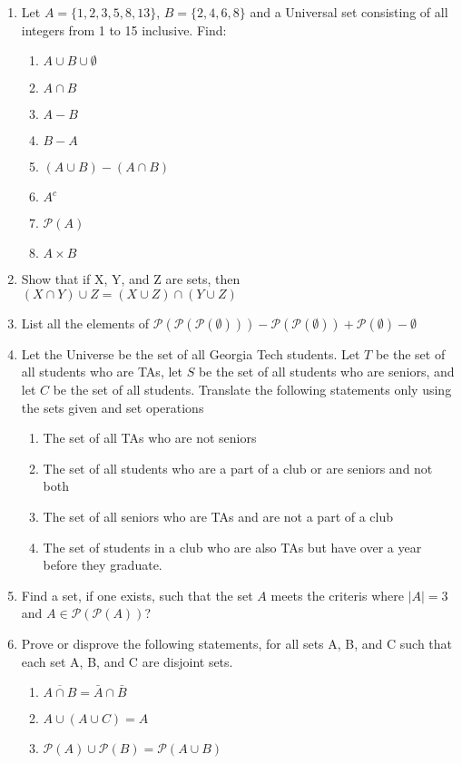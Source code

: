 \documentclass{article}
\begin{document}
\begin{enumerate}
    \item Let $A = \{1, 2, 3, 5, 8, 13\}$,  $B = \{2, 4, 6, 8\}$ and a Universal set consisting of all integers from 1 to 15 inclusive. Find:
        \begin{enumerate}
            \item $A \cup B \cup \emptyset$
            \item $A \cap B$
            \item $A - B$
            \item $B - A$
            \item $(A \cup B) - (A \cap B)$
            \item $A^c$
            \item $\mathcal{P}(A)$
            \item $A \times B$
        \end{enumerate}
    
    \item Show that if X, Y, and Z are sets, then $(X \cap Y) \cup Z = (X \cup Z) \cap (Y \cup Z)$
    
    \item List all the elements of $\mathcal{P}(\mathcal{P}(\mathcal{P}(\emptyset))) - \mathcal{P}(\mathcal{P}(\emptyset)) + \mathcal{P}(\emptyset) - \emptyset$
    \item Let the Universe be the set of all Georgia Tech students. Let $T$ be the set of all students who are TAs, let $S$ be the set of all students who are seniors, and let $C$ be the set of all students. Translate the following statements only using the sets given and set operations
        \begin{enumerate}
            \item The set of all TAs who are not seniors
            \item The set of all students who are a part of a club or are seniors and not both
            \item The set of all seniors who are TAs and are not a part of a club
            \item The set of students in a club who are also TAs but have over a year before they graduate.
        \end{enumerate}
    \item Find a set, if one exists, such that the set $A$ meets the criteris where $|A| = 3$ and $A \in \mathcal{P}(\mathcal{P}(A))$?
    
    \item Prove or disprove the following statements, for all sets A, B, and C such that each set A, B, and C are disjoint sets.
        \begin{enumerate}
            \item $\overline{A \cap B} = \bar{A} \cap \bar{B}$
            \item $A \cup (A \cup C) = A$
            \item $\mathcal{P}(A) \cup \mathcal{P}(B) = \mathcal{P}(A \cup B)$
        \end{enumerate}
    
    
\end{enumerate}
\end{document}
